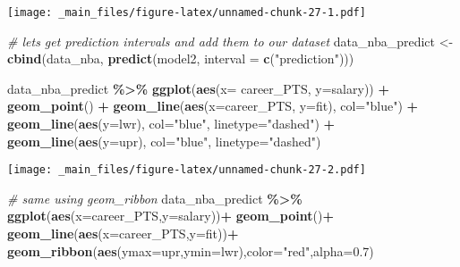 \documentclass[
]{book}
\newenvironment{Shaded}{\begin{snugshade}}{\end{snugshade}}
\newcommand{\AttributeTok}[1]{\textcolor[rgb]{0.13,0.29,0.53}{#1}}
\newcommand{\CommentTok}[1]{\textcolor[rgb]{0.56,0.35,0.01}{\textit{#1}}}
\newcommand{\FloatTok}[1]{\textcolor[rgb]{0.00,0.00,0.81}{#1}}
\newcommand{\FunctionTok}[1]{\textcolor[rgb]{0.13,0.29,0.53}{\textbf{#1}}}
\newcommand{\NormalTok}[1]{#1}
\newcommand{\OtherTok}[1]{\textcolor[rgb]{0.56,0.35,0.01}{#1}}
\newcommand{\SpecialCharTok}[1]{\textcolor[rgb]{0.81,0.36,0.00}{\textbf{#1}}}
\newcommand{\StringTok}[1]{\textcolor[rgb]{0.31,0.60,0.02}{#1}}
\begin{document}
\texttt{[image: \_main\_files/figure-latex/unnamed-chunk-27-1.pdf]}

\begin{Shaded}
\begin{Highlighting}[]
\CommentTok{\# let\textquotesingle{}s get prediction intervals and add them to our dataset}
\NormalTok{data\_nba\_predict }\OtherTok{\textless{}{-}} \FunctionTok{cbind}\NormalTok{(data\_nba, }\FunctionTok{predict}\NormalTok{(model2, }\AttributeTok{interval =} \FunctionTok{c}\NormalTok{(}\StringTok{"prediction"}\NormalTok{)))}

\NormalTok{data\_nba\_predict }\SpecialCharTok{\%\textgreater{}\%}
  \FunctionTok{ggplot}\NormalTok{(}\FunctionTok{aes}\NormalTok{(}\AttributeTok{x=}\NormalTok{ career\_PTS, }\AttributeTok{y=}\NormalTok{salary)) }\SpecialCharTok{+}
  \FunctionTok{geom\_point}\NormalTok{() }\SpecialCharTok{+}
  \FunctionTok{geom\_line}\NormalTok{(}\FunctionTok{aes}\NormalTok{(}\AttributeTok{x=}\NormalTok{career\_PTS, }\AttributeTok{y=}\NormalTok{fit),}
            \AttributeTok{col=}\StringTok{"blue"}\NormalTok{) }\SpecialCharTok{+}
  \FunctionTok{geom\_line}\NormalTok{(}\FunctionTok{aes}\NormalTok{(}\AttributeTok{y=}\NormalTok{lwr),}
                \AttributeTok{col=}\StringTok{"blue"}\NormalTok{,}
                \AttributeTok{linetype=}\StringTok{"dashed"}\NormalTok{) }\SpecialCharTok{+}
  \FunctionTok{geom\_line}\NormalTok{(}\FunctionTok{aes}\NormalTok{(}\AttributeTok{y=}\NormalTok{upr),}
                \AttributeTok{col=}\StringTok{"blue"}\NormalTok{,}
                \AttributeTok{linetype=}\StringTok{"dashed"}\NormalTok{)}
\end{Highlighting}
\end{Shaded}

\texttt{[image: \_main\_files/figure-latex/unnamed-chunk-27-2.pdf]}

\begin{Shaded}
\begin{Highlighting}[]
\CommentTok{\# same using geom\_ribbon}
\NormalTok{data\_nba\_predict }\SpecialCharTok{\%\textgreater{}\%}
\FunctionTok{ggplot}\NormalTok{(}\FunctionTok{aes}\NormalTok{(}\AttributeTok{x=}\NormalTok{career\_PTS,}\AttributeTok{y=}\NormalTok{salary))}\SpecialCharTok{+}
  \FunctionTok{geom\_point}\NormalTok{()}\SpecialCharTok{+}
  \FunctionTok{geom\_line}\NormalTok{(}\FunctionTok{aes}\NormalTok{(}\AttributeTok{x=}\NormalTok{career\_PTS,}\AttributeTok{y=}\NormalTok{fit))}\SpecialCharTok{+}
  \FunctionTok{geom\_ribbon}\NormalTok{(}\FunctionTok{aes}\NormalTok{(}\AttributeTok{ymax=}\NormalTok{upr,}\AttributeTok{ymin=}\NormalTok{lwr),}\AttributeTok{color=}\StringTok{"red"}\NormalTok{,}\AttributeTok{alpha=}\FloatTok{0.7}\NormalTok{)}
\end{Highlighting}
\end{Shaded}
\end{document}
